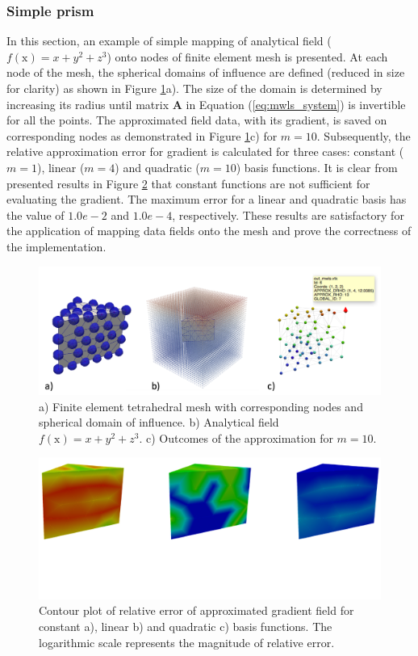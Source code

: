 \documentclass[11pt]{ACMEarticle}
\numberwithin{equation}{section}
\begin{document}
\subsubsection{Simple prism}
In this section, an example of simple mapping of analytical field ($f(\mathrm x)=x + y^2 + z^3 $) %
onto nodes of finite element mesh is presented. At each node of the mesh, the spherical domains of influence are defined (reduced in size for clarity) as shown in Figure \ref{fig:mwlsprism}a). The size of the domain is determined by increasing its radius until matrix $\mathbf A$ in Equation (\ref{eq:mwls_system}) is invertible for all the points. The approximated field data, with its gradient, is saved on corresponding nodes as demonstrated in Figure \ref{fig:mwlsprism}c) for $m=10$. Subsequently, the relative approximation error for gradient is calculated for three cases: constant ($m=1$), linear ($m=4$) and quadratic ($m=10$) basis functions. It is clear from presented results in Figure \ref{fig:prism_error} that constant functions are not sufficient for evaluating the gradient. The maximum error for a linear and quadratic basis has the value of $1.0e-2$ and $1.0e-4$, respectively. These results are satisfactory for the application of mapping data fields onto the mesh and prove the correctness of the implementation.
\begin{figure}[h!]
	\centering
	\includegraphics[width=0.8\linewidth]{Figures/mwls_prism}
	\caption{a) Finite element tetrahedral mesh with corresponding nodes and spherical domain of influence. b) Analytical field $f(\mathrm x) = x + y^2 + z^3$. c) Outcomes of the approximation for $m=10$.}
	\label{fig:mwlsprism}
\end{figure}
\begin{figure}[h!]
	\centering
	\includegraphics[width=0.8\linewidth]{Figures/prism_error}
	\caption{Contour plot of relative error of approximated gradient field for constant a), linear b) and quadratic c) basis functions. The logarithmic scale represents the magnitude of relative error.}
	\label{fig:prism_error}
\end{figure}
\end{document}

